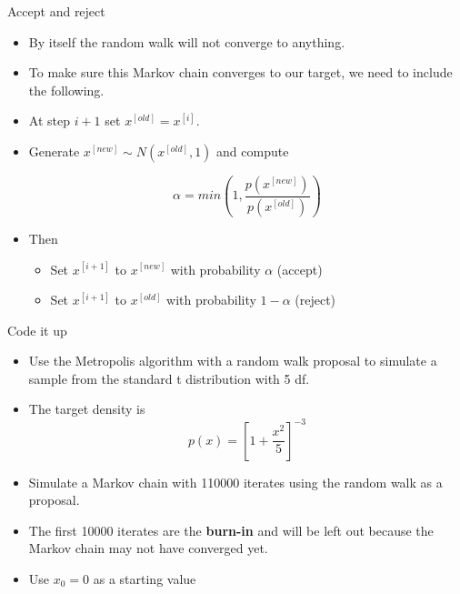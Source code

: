 \documentclass[10pt]{beamer}
\begin{document}
\begin{frame}{Accept and reject}
\begin{itemize}
\item By itself the random walk will not converge to anything.

\item To make sure this Markov chain converges to our target, we need to include the following.

\item At step $i+1$ set $x^{[old]}=x^{[i]}$.

\item Generate $x^{[new]}\sim N(x^{[old]},1)$ and compute

\begin{equation}
\alpha=min\left(1,\frac{p(x^{[new]})}{p(x^{[old]})}\right)
\end{equation}

\item Then

\begin{itemize}
\item Set $x^{[i+1]}$ to $x^{[new]}$ with probability $\alpha$ (accept)

\item Set $x^{[i+1]}$ to $x^{[old]}$ with probability $1-\alpha$ (reject)
\end{itemize}
\end{itemize}
\end{frame}
\begin{frame}{Code it up}
\begin{itemize}
\item Use the Metropolis algorithm with a random walk proposal to simulate a sample from the standard t distribution with 5 df.

\item The target density is
\begin{equation}
p(x)=\left[1+\frac{x^2}{5}\right]^{-3}
\end{equation}

\item Simulate a Markov chain with 110000 iterates using the random walk as a proposal.

\item The first 10000 iterates are the {\bf burn-in} and will be left out because the Markov chain may not have converged yet.

\item Use $x_0=0$ as a starting value
\end{itemize}
\end{frame}
\end{document}
